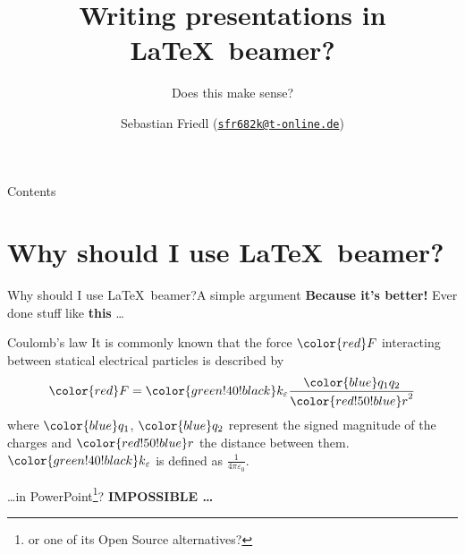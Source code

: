 \documentclass[11pt]{beamer}
\title{Writing presentations in \LaTeX\ beamer?}
\subtitle{Does this make sense?}
\author[Sebastian Friedl]{Sebastian Friedl (\href{mailto:sfr682k@t-online.de}{\texttt{sfr682k@t-online.de}})}
\institute{\itshape Dedicated to both, \LaTeX\ beamer's developers and (possible) users}
\begin{document}
	\frame{\maketitle}
	
	
	\begin{frame}{Contents}
		\tableofcontents
	\end{frame}
	
	
	\section[Why \LaTeX\ beamer?]{Why should I use \LaTeX\ beamer?}
	\begin{frame}{Why should I use \LaTeX\ beamer?}{A simple argument}
		\textbf{\color{red} Because it's better!} Ever done stuff like \textbf{this} \dots
		
		
		\vfill
		\begin{block}{Coulomb's law}
			It is commonly known that the force $\color{red} F$ interacting between statical electrical particles is described by
			\begin{equation*}
				{\color{red} F} = {\color{green!40!black} k_\varepsilon} \frac{\color{blue} q_1 q_2}{{\color{red!50!blue} r}^2}
			\end{equation*}
			where $\color{blue} q_1$, $\color{blue} q_2$ represent the signed magnitude of the charges and $\color{red!50!blue} r$ the distance between them.  $\color{green!40!black} k_\varepsilon$ is defined as $\frac{1}{4\pi \varepsilon_0}$.
		\end{block}
		\vfill
		
		
		\dots in PowerPoint\footnote{or one of its Open Source alternatives?}? \textbf{IMPOSSIBLE \dots}
	\end{frame}

	
\end{document}
